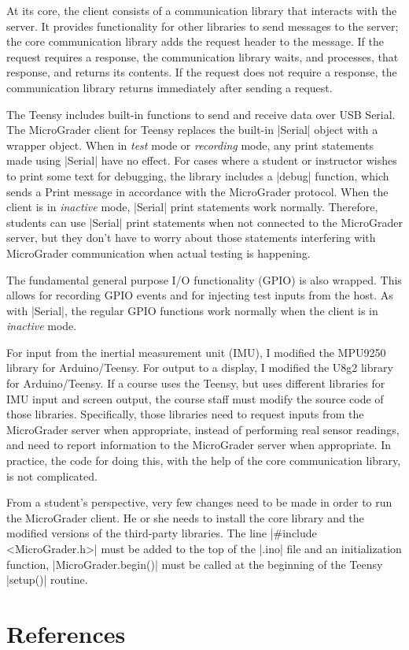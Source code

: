 \documentclass[12pt]{article}
\begin{document}
At its core, the client consists of a communication library that interacts with the server.  It provides functionality for other libraries to send messages to the server; the core communication library adds the request header to the message.  If the request requires a response, the communication library waits, and processes, that response, and returns its contents.  If the request does not require a response, the communication library returns immediately after sending a request.

The Teensy includes built-in functions to send and receive data over USB Serial.  The MicroGrader client for Teensy replaces the built-in |Serial| object with a wrapper object.  When in \textit{test} mode or \textit{recording} mode, any print statements made using |Serial| have no effect.  For cases where a student or instructor wishes to print some text for debugging, the library includes a |debug| function, which sends a Print message in accordance with the MicroGrader protocol.  When the client is in \textit{inactive} mode, |Serial| print statements work normally.  Therefore, students can use |Serial| print statements when not connected to the MicroGrader server, but they don't have to worry about those statements interfering with MicroGrader communication when actual testing is happening.

The fundamental general purpose I/O functionality (GPIO) is also wrapped.  This allows for recording GPIO events and for injecting test inputs from the host.  As with |Serial|, the regular GPIO functions work normally when the client is in \textit{inactive} mode. 

For input from the inertial measurement unit (IMU), I modified the MPU9250 library for Arduino/Teensy.  For output to a display, I modified the U8g2 library for Arduino/Teensy.  If a course uses the Teensy, but uses different libraries for IMU input and screen output, the course staff must modify the source code of those libraries.  Specifically, those libraries need to request inputs from the MicroGrader server when appropriate, instead of performing real sensor readings, and need to report information to the MicroGrader server when appropriate.  In practice, the code for doing this, with the help of the core communication library, is not complicated.

From a student's perspective, very few changes need to be made in order to run the MicroGrader client.  He or she needs to install the core library and the modified versions of the third-party libraries.  The line |#include <MicroGrader.h>| must be added to the top of the |.ino| file and an initialization function, |MicroGrader.begin()| must be called at the beginning of the Teensy |setup()| routine.

\newpage
\section{References}
\end{document}
